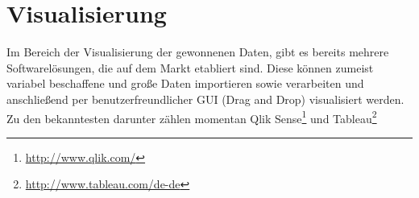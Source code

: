 \documentclass[paper=a4, fontsize=11pt]{scrartcl}
\begin{document}
\section*{Visualisierung}
Im Bereich der Visualisierung der gewonnenen Daten, gibt es bereits mehrere Softwarel\"osungen, die auf dem Markt etabliert sind. Diese k\"onnen zumeist variabel beschaffene und gro\ss{}e Daten importieren sowie verarbeiten und anschlie\ss{}end per benutzerfreundlicher GUI (Drag and Drop) visualisiert werden. Zu den bekanntesten darunter z\"ahlen momentan Qlik Sense\footnote{\url{http://www.qlik.com/}} und Tableau\footnote{\url{http://www.tableau.com/de-de}} 
\end{document}
